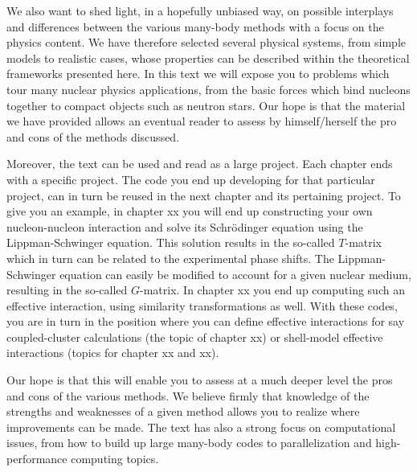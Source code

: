 We also  want  to shed light, in a hopefully unbiased way, on possible interplays and
differences between the various many-body methods with a focus
on the physics content. 
We have therefore selected several physical systems,
from simple models to realistic cases,  whose properties can be
described within the theoretical frameworks presented here.
In this text we will expose you to problems which tour many nuclear physics applications, 
from the basic forces which bind nucleons together to compact objects such as neutron stars.  
Our hope is that the material we have provided   allows an eventual reader to  assess 
by himself/herself the pro and cons of the methods discussed.

Moreover,  the text can be used and read as a large project. Each chapter ends with a specific project. The code you end up developing 
for that particular project, can in turn be  reused in the next chapter and its pertaining project.  To give you an example,
in chapter xx you will end up constructing your own nucleon-nucleon interaction and solve its Schr\"odinger equation using the Lippman-Schwinger
equation.  This solution results in the so-called $T$-matrix  which in turn can be related to the experimental phase shifts.
The Lippman-Schwinger equation can easily be modified to account for a given nuclear medium, resulting in the 
so-called $G$-matrix.  In chapter xx you end up computing such an effective interaction, using similarity transformations as well.
With these codes, you are in turn in the position where you can define effective interactions for say coupled-cluster calculations
(the topic of chapter xx) or shell-model effective interactions (topics for chapter xx and xx).

Our hope is that this will enable  you to assess at a much deeper level the pros and cons of the various methods.  
We believe firmly that knowledge of the strengths and weaknesses of a given method allows you to realize where
improvements can be made.   The text has also a strong focus on computational issues, from how to build up large many-body codes 
to parallelization and high-performance computing topics.




